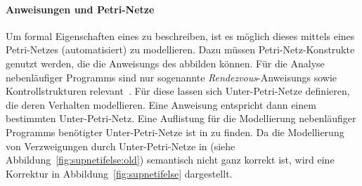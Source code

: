 \paragraph{Anweisungen und Petri-Netze}
Um formal Eigenschaften eines  zu beschreiben, ist es möglich dieses mittels eines Petri-Netzes (automatisiert) zu modellieren. Dazu müssen Petri-Netz-Konstrukte genutzt werden, die die \glspl{Anweisung} des  abbilden können. Für die Analyse nebenläufiger \glspl{Programm} sind nur sogenannte \emph{Rendezvous}-\glspl{Anweisung} sowie Kontrollstrukturen relevant~\cite{Goel1990}. Für diese lassen sich Unter-Petri-Netze definieren, die deren Verhalten modellieren. Eine Anweisung entspricht dann einem bestimmten Unter-Petri-Netz. Eine Auflistung für die Modellierung nebenläufiger \glspl{Programm} benötigter Unter-Petri-Netze ist in \cite{Goel1990} zu finden.  Da die Modellierung von Verzweigungen durch Unter-Petri-Netze in \cite[Abbildung 3.1]{Goel1990} (siehe Abbildung~\ref{fig:supnetifelse:old}) semantisch nicht ganz korrekt ist, wird eine Korrektur in Abbildung~\ref{fig:supnetifelse} dargestellt. 
